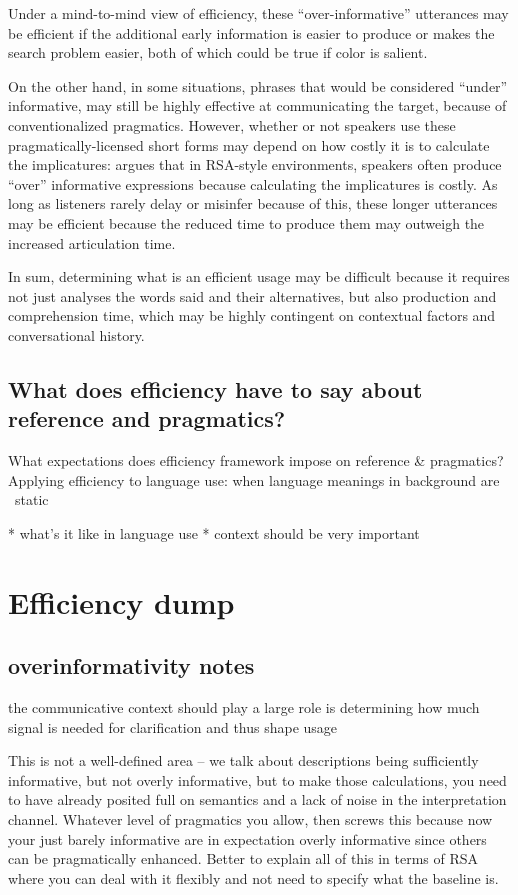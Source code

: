 \documentclass[]{article}
\begin{document}
Under a mind-to-mind view of efficiency, these ``over-informative'' utterances may be efficient if the additional early information is easier to produce or makes the search problem easier, both of which could be true if color is salient. 

On the other hand, in some situations, phrases that would be considered ``under'' informative, may still be highly effective at communicating the target, because of conventionalized pragmatics. However, whether or not speakers use these pragmatically-licensed short forms may depend on how costly it is to calculate the implicatures:  \cite{baumann2014} argues that in RSA-style environments, speakers often produce ``over'' informative expressions because calculating the implicatures is costly. As long as listeners rarely delay or misinfer because of this, these longer utterances may be efficient because the reduced time to produce them may outweigh the increased articulation time. 


In sum, determining what is an efficient usage may be difficult because it requires not just analyses the words said and their alternatives, but also production and comprehension time, which may be highly contingent on contextual factors and conversational history. 

\subsection{What does efficiency have to say about reference and pragmatics?}

What expectations does efficiency framework impose on reference \& pragmatics?  
Applying efficiency to language use: when language meanings in background are ~static 


* what's it like in language use
* context should be very important



\section{Efficiency dump}
\subsection{overinformativity notes}
the communicative context should play a large role is determining how much signal is needed for clarification and thus shape usage 

This is not a well-defined area -- we talk about descriptions being sufficiently informative, but not overly informative, but to make those calculations, you need to have already posited full on semantics and a lack of noise in the interpretation channel. Whatever level of pragmatics you allow, then screws this because now your just barely informative are in expectation overly informative since others can be pragmatically enhanced. Better to explain all of this in terms of RSA where you can deal with it flexibly and not need to specify what the baseline is. 
\end{document}
